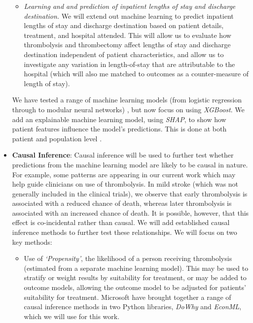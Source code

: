 \begin{itemize}
\begin{itemize}
        \item \textit{Learning and and prediction of inpatient lengths of stay and discharge destination.} We will extend out machine learning to predict inpatient lengths of stay and discharge destination based on patient details, treatment, and hospital attended. This will allow us to evaluate how thrombolysis and thrombectomy affect lengths of stay and discharge destination independent of patient characteristics, and allow us to investigate any variation in length-of-stay that are attributable to the hospital (which will also me matched to outcomes as a counter-measure of length of stay).
        
    \end{itemize}

    We have tested a range of machine learning models (from logistic regression through to modular neural networks) \cite{allen_using_2022}, but now focus on using \textit{XGBoost}. We add an explainable machine learning model, using \textit{SHAP}, to show how patient features influence the model's predictions. This is done at both patient and population level \cite{pearn_what_2023}.  

    \item \textbf{Causal Inference}: Causal inference will be used to further test whether predictions from the machine learning model are likely to be causal in nature. For example, some patterns are appearing in our current work which may help guide clinicians on use of thrombolysis. In mild stroke (which was not generally included in the clinical trials), we observe that early thrombolysis is associated with a reduced chance of death, whereas later thrombolysis is associated with an increased chance of death. It is possible, however, that this effect is co-incidental rather than causal. We will add established causal inference methods to further test these relationships. We will focus on two key methods:

    \begin{itemize}
        \item Use of \textit{`Propensity'}, the likelihood of a person receiving thrombolysis (estimated from a separate machine learning model). This may be used to stratify or weight results by suitability for treatment, or may be added to outcome models, allowing the outcome model to be adjusted for patients' suitability for treatment. Microsoft have brought together a range of causal inference methods in two Python libraries, \textit{DoWhy} and \textit{EconML}, which we will use for this work.


\end{itemize}
\end{itemize}
